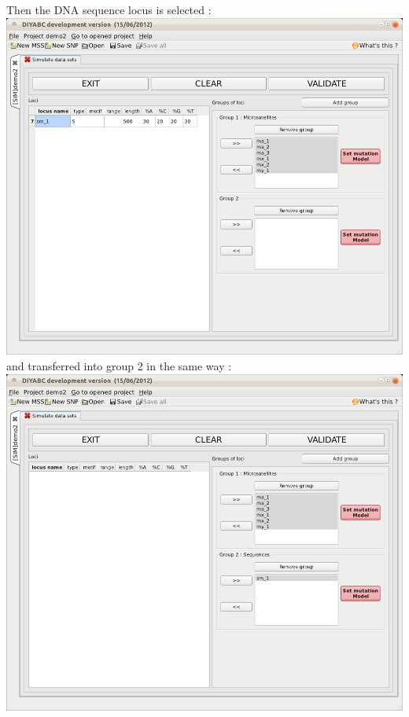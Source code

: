 Then the DNA sequence locus is selected :\\

\includegraphics[scale=0.33]{gui_pictures/Capture-DIYABC-78.png} \\

and transferred into group 2 in the same way :\\

\includegraphics[scale=0.33]{gui_pictures/Capture-DIYABC-79.png} \\

